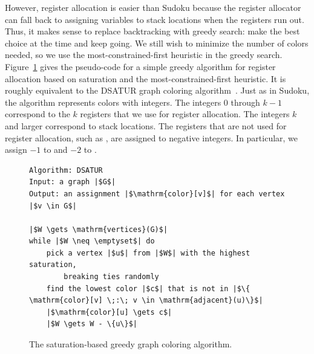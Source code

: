 \documentclass[7x10]{TimesAPriori_MIT}%
\begin{document}
However, register allocation is easier than Sudoku because the
register allocator can fall back to assigning variables to stack
locations when the registers run out. Thus, it makes sense to replace
backtracking with greedy search: make the best choice at the time and
keep going. We still wish to minimize the number of colors needed, so
we use the most-constrained-first heuristic in the greedy search.
Figure~\ref{fig:satur-algo} gives the pseudo-code for a simple greedy
algorithm for register allocation based on saturation and the
most-constrained-first heuristic. It is roughly equivalent to the
DSATUR graph coloring algorithm~\citep{Brelaz:1979eu}.
Just as in Sudoku, the algorithm represents colors with integers. The
integers $0$ through $k-1$ correspond to the $k$ registers that we use
for register allocation. The integers $k$ and larger correspond to
stack locations. The registers that are not used for register
allocation, such as , are assigned to negative integers. In
particular, we assign $-1$ to  and $-2$ to .



\begin{figure}[btp]
  \centering
\begin{lstlisting}[basicstyle=\rmfamily,deletekeywords={for,from,with,is,not,in,find},morekeywords={while},columns=fullflexible]
Algorithm: DSATUR
Input: a graph |$G$|
Output: an assignment |$\mathrm{color}[v]$| for each vertex |$v \in G$|

|$W \gets \mathrm{vertices}(G)$|
while |$W \neq \emptyset$| do
    pick a vertex |$u$| from |$W$| with the highest saturation,
        breaking ties randomly
    find the lowest color |$c$| that is not in |$\{ \mathrm{color}[v] \;:\; v \in \mathrm{adjacent}(u)\}$|
    |$\mathrm{color}[u] \gets c$|
    |$W \gets W - \{u\}$|
\end{lstlisting}
  \caption{The saturation-based greedy graph coloring algorithm.}
  \label{fig:satur-algo}
\end{figure}
\end{document}
